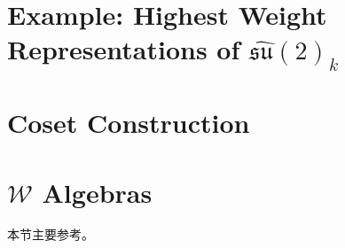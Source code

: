 \section{Example: Highest Weight Representations of $\widehat{\mathfrak{su}}(2)_{k}$ }
\section{Coset Construction}
\section{$\mathcal{W}$ Algebras}
本节主要参考\cite{Pope:1991ig}。
